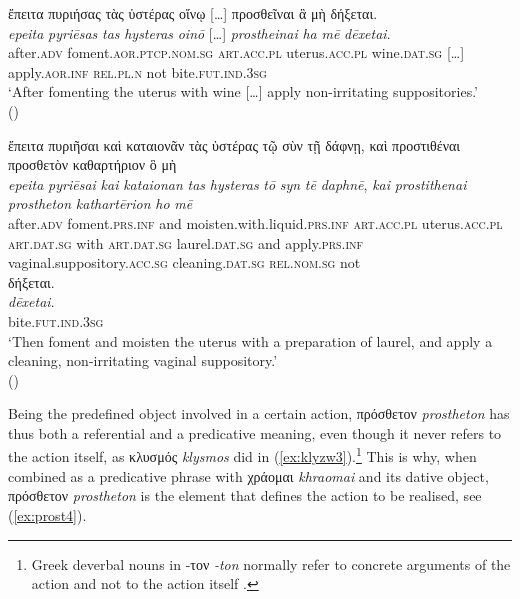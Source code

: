 \documentclass[output=paper,colorlinks,citecolor=brown]{langscibook}
\begin{document}
\begin{exe}
\ex\label{ex:prost2}
\glll ἔπειτα πυριήσας τὰς ὑστέρας οἴνῳ […] προσθεῖναι ἃ μὴ δήξεται. \\ 
\textit{epeita} \textit{pyriēsas} \textit{tas} \textit{hysteras} \textit{oinō}  […] \textit{prostheinai} \textit{ha} \textit{mē} \textit{dēxetai}. \\
after.\textsc{adv} foment.\textsc{aor.ptcp.nom.sg} \textsc{art.acc.pl} uterus.\textsc{acc.pl} wine.\textsc{dat.sg} […] apply.\textsc{aor.inf} \textsc{rel.pl.n} not bite.\textsc{fut.ind.3sg} \\
\glt ‘After fomenting the uterus with wine […] apply non-irritating suppositories.' \\
\hspace*{\fill}()
\end{exe}

\begin{exe}
\ex\label{ex:prost3}
\glll ἔπειτα πυριῆσαι καὶ καταιονᾶν τὰς ὑστέρας τῷ σὺν τῇ δάφνῃ, καὶ προστιθέναι προσθετὸν καθαρτήριον ὃ μὴ  \\ 
\textit{epeita} \textit{pyriēsai} \textit{kai} \textit{kataionan} \textit{tas} \textit{hysteras} \textit{tō} \textit{syn} \textit{tē} \textit{daphnē}, \textit{kai} \textit{prostithenai} \textit{prostheton} \textit{kathartērion} \textit{ho} \textit{mē}  \\
after.\textsc{adv} foment.\textsc{prs.inf} and moisten.with.liquid.\textsc{prs.inf} \textsc{art.acc.pl} uterus.\textsc{acc.pl} \textsc{art.dat.sg} with \textsc{art.dat.sg} laurel.\textsc{dat.sg} and apply.\textsc{prs.inf} vaginal.suppository.\textsc{acc.sg} cleaning.\textsc{dat.sg} \textsc{rel.nom.sg} not  \\

\glll δήξεται. \\
\textit{dēxetai}. \\
bite.\textsc{fut.ind.3sg} \\
\glt ‘Then foment and moisten the uterus with a preparation of laurel, and apply a cleaning, non-irritating vaginal suppository.' \\
\hspace*{\fill}()
\end{exe}

Being the predefined object involved in a certain action, πρόσθετον \textit{prostheton} has thus both a referential and a predicative meaning, even though it never refers to the action itself, as κλυσμός \textit{klysmos} did in (\ref{ex:klyzw3}).\footnote{Greek deverbal nouns in -τον \textit{-ton} normally refer to concrete arguments of the action and not to the action itself \citep[180--181]{Civilleri2012}.} This is why, when combined as a predicative phrase with χράομαι \textit{khraomai} and its dative object, πρόσθετον \textit{prostheton} is the element that defines the action to be realised, see (\ref{ex:prost4}).
\end{document}
